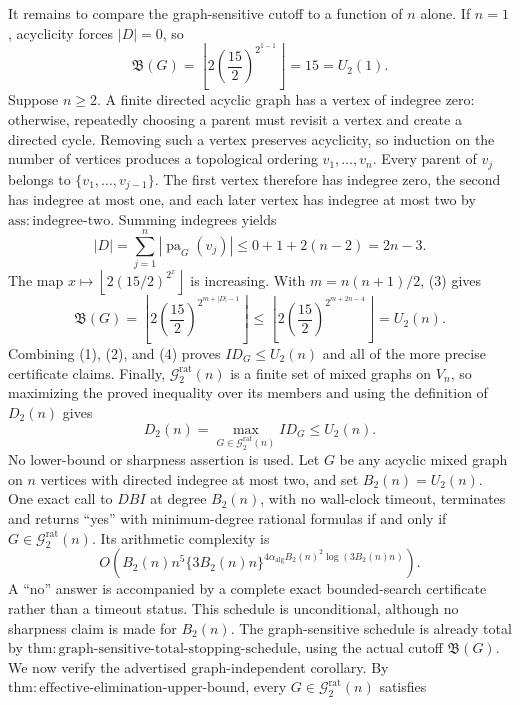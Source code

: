 It remains to compare the graph-sensitive cutoff to a function of \(n\) alone.  If \(n=1\), acyclicity forces \(|D|=0\), so
\[
 \mathfrak B(G)
 =\left\lfloor2\left(\frac{15}{2}\right)^{2^{1-1}}\right\rfloor
 =15
 =U_2(1).
 \tag{2}
\]
Suppose \(n\geq2\).  A finite directed acyclic graph has a vertex of indegree zero: otherwise, repeatedly choosing a parent must revisit a vertex and create a directed cycle.  Removing such a vertex preserves acyclicity, so induction on the number of vertices produces a topological ordering \(v_1,\ldots,v_n\).  Every parent of \(v_j\) belongs to \(\{v_1,\ldots,v_{j-1}\}\).  The first vertex therefore has indegree zero, the second has indegree at most one, and each later vertex has indegree at most two by \(\mathrm{ass:indegree\mbox{-}two}\).  Summing indegrees yields
\[
 |D|=\sum_{j=1}^n|\operatorname{pa}_G(v_j)|
 \leq0+1+2(n-2)=2n-3.
 \tag{3}
\]
The map \(x\mapsto\left\lfloor2(15/2)^{2^x}\right\rfloor\) is increasing.  With \(m=n(n+1)/2\), (3) gives
\[
 \mathfrak B(G)
 =\left\lfloor2\left(\frac{15}{2}\right)^{2^{m+|D|-1}}\right\rfloor
 \leq
 \left\lfloor2\left(\frac{15}{2}\right)^{2^{m+2n-4}}\right\rfloor
 =U_2(n).
 \tag{4}
\]
Combining (1), (2), and (4) proves \(ID_G\leq U_2(n)\) and all of the more precise certificate claims.  Finally, \(\mathcal G_{2}^{\mathrm{rat}}(n)\) is a finite set of mixed graphs on \(V_n\), so maximizing the proved inequality over its members and using the definition of \(D_2(n)\) gives
\[
 D_2(n)=\max_{G\in\mathcal G_{2}^{\mathrm{rat}}(n)}ID_G\leq U_2(n).
\]
No lower-bound or sharpness assertion is used.
Let \(G\) be any acyclic mixed graph on \(n\) vertices with directed indegree at most two, and set \(B_2(n)=U_2(n)\).  One exact call to \(DBI\) at degree \(B_2(n)\), with no wall-clock timeout, terminates and returns ``yes'' with minimum-degree rational formulas if and only if \(G\in\mathcal G_{2}^{\mathrm{rat}}(n)\).  Its arithmetic complexity is
\[
 O\!\left(B_2(n)n^5\{3B_2(n)n\}^{4\alpha_{\mathrm{alg}}B_2(n)^2\log(3B_2(n)n)}\right).
\]
A ``no'' answer is accompanied by a complete exact bounded-search certificate rather than a timeout status.  This schedule is unconditional, although no sharpness claim is made for \(B_2(n)\).
The graph-sensitive schedule is already total by \(\mathrm{thm:graph\mbox{-}sensitive\mbox{-}total\mbox{-}stopping\mbox{-}schedule}\), using the actual cutoff \(\mathfrak B(G)\).  We now verify the advertised graph-independent corollary.  By \(\mathrm{thm:effective\mbox{-}elimination\mbox{-}upper\mbox{-}bound}\), every \(G\in\mathcal G_{2}^{\mathrm{rat}}(n)\) satisfies
